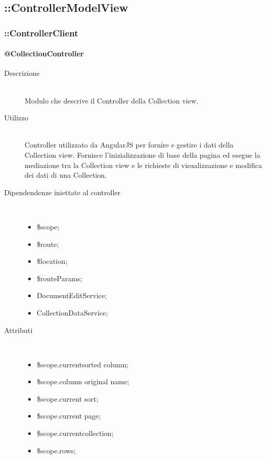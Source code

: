 \subsection{::ControllerModelView}

\subsubsection{::ControllerClient}

\paragraph{@CollectionController}
\begin{description}
 \item[Descrizione] \hfill \\
 Modulo che descrive il Controller della Collection view.
 
 \item[Utilizzo] \hfill \\
 Controller utilizzato da AngularJS per fornire e gestire i dati della Collection view.
 Fornisce l'inizializzazione di base della pagina ed esegue la mediazione tra la Collection view
 e le richieste di visualizzazione e modifica dei dati di una Collection.
 
 \item[Dipendendenze iniettate al controller] \hfill \\
 \begin{itemize}
  \item \$scope;
  \item \$route;
  \item \$location;
  \item \$routeParams;
  \item DocumentEditService;
  \item CollectionDataService;
 \end{itemize}
 
 \item[Attributi] \hfill \\
 \begin{itemize}
 \item \$scope.current\textunderscore sorted \textunderscore column;
 \item \$scope.column \textunderscore original \textunderscore name;
 \item \$scope.current \textunderscore sort;
 \item \$scope.current \textunderscore page;
 \item \$scope.current\textunderscore collection;
 \item \$scope.rows;
 \end{itemize}
 

\end{description}
